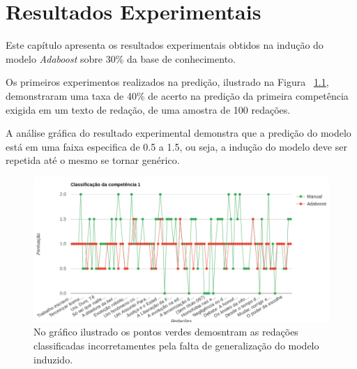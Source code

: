 \chapter{Resultados Experimentais}\label{result}

Este capítulo apresenta os resultados experimentais obtidos na indução do modelo \textit{Adaboost} sobre 30\% da base de conhecimento.

Os primeiros experimentos realizados na predição, ilustrado na Figura ~\ref{fig:resultados_experimentais_1}, demonstraram uma taxa de 40\% de acerto na predição da primeira competência exigida em um texto de redação, de uma amostra de 100 redações. 

A análise gráfica do resultado experimental demonstra que a predição do modelo está em uma faixa especifica de 0.5 a 1.5, ou seja, a indução do modelo deve ser repetida até o mesmo se tornar genérico.

\begin{figure}[H]
\begin{center}
    \includegraphics[scale=0.70]{figuras/resultados_experimentais.png}
\end{center}
\caption{No gráfico ilustrado os pontos verdes demosntram as redações classificadas incorretamentes pela falta de generalização do modelo induzido.}
\label{fig:resultados_experimentais_1}
\end{figure}